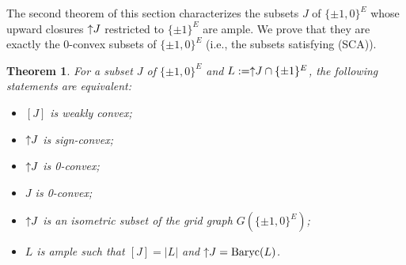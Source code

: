 \documentclass[11pt,a4paper]{amsart}
\newtheorem{theorem}{Theorem}
\theoremstyle{definition}
\numberwithin{equation}{section}
\DeclareMathOperator{\Baryc}{Baryc}
\newcommand{\covectors}{\ensuremath{L}}
\newcommand{\hcovectors}{J}
\begin{document}
The second theorem of this section characterizes the subsets $\hcovectors$ of $\{ \pm 1, 0\}^E$ whose upward closures  $\uparrow\hspace*{-0.1cm}\hcovectors$ restricted to $\{ \pm 1\}^E$ are ample. We prove that they are exactly the 0-convex subsets of $\{ \pm 1, 0\}^E$ (i.e., the subsets satisfying (SCA)).


\begin{theorem} \label{barycenters-ample} For a subset $\hcovectors$ of $\{ \pm 1,0\}^E$ and $\covectors:=\uparrow\hspace*{-0.1cm}\hcovectors\cap \{ \pm 1\}^E$, the following statements are equivalent:
\begin{itemize}
\item[\rm(i)] $[\hcovectors]$ is weakly convex;
\item[\rm(ii)] $\uparrow\hspace*{-0.1cm}\hcovectors$ is sign-convex;
\item[\rm(iii)] $\uparrow\hspace*{-0.1cm}\hcovectors$ is 0-convex;
\item[\rm(iv)] $\hcovectors$ is 0-convex;
\item[\rm(v)] $\uparrow\hspace*{-0.1cm}\hcovectors$ is an isometric subset of the grid graph $G(\{ \pm 1,0\}^E)$;
\item[\rm(vi)] $\covectors$ is ample such that $[\hcovectors]=|\covectors|$
and  $\uparrow\hspace*{-0.1cm}\hcovectors=\Baryc(\covectors)$.
\end{itemize}
\end{theorem}
\end{document}
